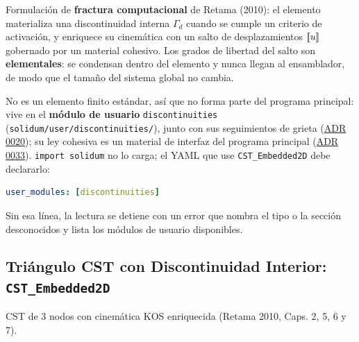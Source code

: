 \documentclass[11pt,oneside]{report}
\providecommand{\llbracket}{\mathopen{[\mkern-3.2mu[}}
\providecommand{\rrbracket}{\mathclose{]\mkern-3.2mu]}}
\begin{document}
Formulación de \textbf{fractura computacional} de Retama (2010): el elemento materializa una discontinuidad interna $\Gamma_d$ cuando se cumple un criterio de activación, y enriquece su cinemática con un salto de desplazamientos $\llbracket u \rrbracket$ gobernado por un material cohesivo. Los grados de libertad del salto son \textbf{elementales}: se condensan dentro del elemento y nunca llegan al ensamblador, de modo que el tamaño del sistema global no cambia.

No es un elemento finito estándar, así que no forma parte del programa principal: vive en el \textbf{módulo de usuario} \texttt{discontinuities} (\texttt{solidum/\allowbreak{}user/\allowbreak{}discontinuities/\allowbreak{}}), junto con sus seguimientos de grieta (\href{https://github.com/jretamav/solidum-fem/blob/main/docs/adr/0020-modulos-de-usuario.md}{ADR 0020}); su ley cohesiva es un material de interfaz del programa principal (\href{https://github.com/jretamav/solidum-fem/blob/main/docs/adr/0033-materiales-de-interfaz.md}{ADR 0033}). \texttt{import solidum} no lo carga; el YAML que use \texttt{CST\_Embedded2D} debe declararlo:

\begin{lstlisting}[language=yaml]
user_modules: [discontinuities]

\end{lstlisting}

Sin esa línea, la lectura se detiene con un error que nombra el tipo o la sección desconocidos y lista los módulos de usuario disponibles.

\subsection{Triángulo CST con Discontinuidad Interior: \texttt{CST\_Embedded2D}}

CST de 3 nodos con cinemática KOS enriquecida (Retama 2010, Caps. 2, 5, 6 y 7).
\end{document}
